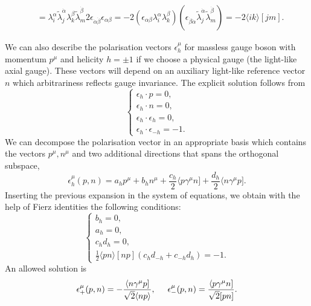 \begin{enumerate}
\begin{align*}
		&=\lambda_{i}^\alpha \tilde\lambda_{j}^{ \dot \alpha}\lambda_{k}^\beta \tilde\lambda_{m}^{ \dot \beta} 2 \epsilon_{\dot\alpha\dot\beta} \epsilon_{\alpha\beta}=-2\left(\epsilon_{\alpha\beta}\lambda_{i}^\alpha\lambda_{k}^\beta\right)\left(\epsilon_{\dot\beta\dot\alpha} \tilde\lambda_{j}^{ \dot \alpha}\tilde\lambda_{m}^{ \dot \beta}\right)=-2\langle ik \rangle[jm].
	\end{align*}
\end{enumerate}
We can also describe the polarisation vectors $\epsilon_h^\mu$ for massless gauge boson with momentum $p^\mu$ and helicity $h=\pm1$ if we choose a physical gauge (the light-like axial gauge). These vectors will depend on an auxiliary light-like reference vector $n$ which arbitrariness reflects gauge invariance. The explicit solution follows from
$$
	\begin{cases}
		\epsilon_h\cdot p=0,\\
		\epsilon_h\cdot n=0,\\
		\epsilon_h\cdot \epsilon_h=0,\\
		\epsilon_h\cdot \epsilon_{-h}=-1.
	\end{cases}
$$
We can decompose the polarisation vector in an appropriate basis which contains the vectors $p^\mu, n^\mu$ and two additional directions that spans the orthogonal subspace,
$$
	\epsilon^\mu_h(p,n)=a_h p^\mu+b_h n^\mu+\frac{c_h}{2} \langle p \gamma^\mu n]+\frac{d_h}{2}\langle n\gamma^\mu p].
$$
Inserting the previous expansion in the system of equations, we obtain with the help of Fierz identities the following conditions:
$$
	\begin{cases}
		b_h=0,\\
		a_h=0,\\
		c_{h}d_{h}=0,\\
		\frac{1}{2}\langle pn\rangle[np]\left(c_{h}d_{-h}+c_{-h}d_{h}\right)=-1.
	\end{cases}
$$
An allowed solution is
\begin{align}
	\epsilon_+^{\mu}(p,n)=-\frac{\langle n\gamma^\mu p]}{\sqrt{2}\langle np \rangle},\hspace{0.5cm}\epsilon_-^{\mu}(p,n)=\frac{\langle p\gamma^\mu n]}{\sqrt2 [pn]}.	\label{solepsilon}
\end{align}
\iffalse
